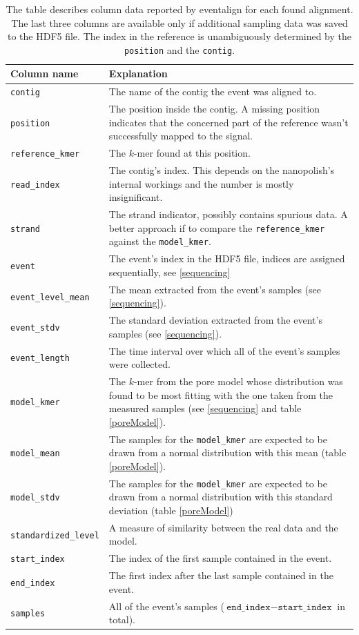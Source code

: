 \documentclass[times, utf, seminar]{fer}
\begin{document}
\begin{table}
	\centering
	\begin{tabular}{l|p{10cm}}
		Column name & Explanation\\
		\hline
	\texttt{contig} & The name of the contig the event was aligned to. \\
	\texttt{position} & The position inside the contig. A missing position indicates that the concerned part of the reference wasn't successfully mapped to the signal. \\
	\texttt{reference\_kmer} & The $k$-mer found at this position. \\       
	\texttt{read\_index} & The contig's index. This depends on the nanopolish's internal workings and the number is mostly insignificant. \\
	\texttt{strand}  & The strand indicator, possibly contains spurious data. A better approach if to compare the \texttt{reference\_kmer} against the \texttt{model\_kmer}. \\
	\texttt{event} &  The event's index in the HDF5 file, indices are assigned sequentially, see \ref{sequencing}\\
	\texttt{event\_level\_mean} & The mean extracted from the event's samples (see \ref{sequencing}). \\
	\texttt{event\_stdv} & The standard deviation extracted from the event's samples (see \ref{sequencing}). \\
	\texttt{event\_length} & The time interval over which all of the event's samples were collected. \\
	\texttt{model\_kmer} &  The $k$-mer from the pore model whose distribution was found to be most fitting with the one taken from the measured samples (see \ref{sequencing} and table \ref{poreModel}). \\
	\texttt{model\_mean} & The samples for the \texttt{model\_kmer} are expected to be drawn from a normal distribution with this mean (table \ref{poreModel}). \\
	\texttt{model\_stdv} & The samples for the \texttt{model\_kmer} are expected to be drawn from a normal distribution with this standard deviation (table \ref{poreModel}) \\
	\texttt{standardized\_level} & A measure of similarity between the real data and the model. \\
	\texttt{start\_index} & The index of the first sample contained in the event. \\               
	\texttt{end\_index} & The first index after the last sample contained in the event. \\
	\texttt{samples} & All of the event's samples ($\texttt{end\_index} - \texttt{start\_index}$ in total).     
	\end{tabular}
	\caption{The table describes column data reported by eventalign for each found alignment. The last three columns are available only if additional sampling data was saved to the HDF5 file. The index in the reference is unambiguously determined by the \texttt{position} and the \texttt{contig}.}
	\label{nanopolishOutput}
\end{table}
\end{document}
